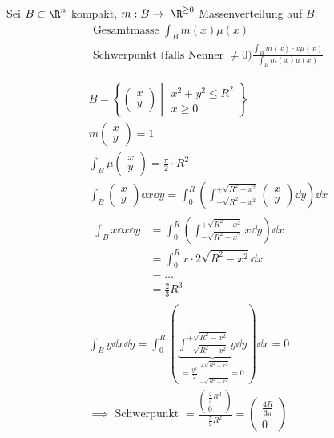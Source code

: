 Sei $B \subset \R^n$ kompakt, $m : B \rightarrow \R^{\geq 0}$ Massenverteilung auf $B$. \\
\begin{gather*}
	\text{Gesamtmasse } \int_B m(x) \mu(x) \\
	\text{Schwerpunkt (falls Nenner $\neq 0$)} \frac{\int_B m(x) \cdot x \mu(x)}{\int_B m(x) \mu(x)}
\end{gather*}
\begin{bsp*}[note = Hablkreisscheibe]
	\begin{gather*}
		B = \left\{ \begin{pmatrix} x \\ y \end{pmatrix} \middle| \begin{matrix} x^2 + y^2 \leq R^2 \\ x \geq 0 \end{matrix} \right\} \\
		m\begin{pmatrix} x \\ y \end{pmatrix} = 1 \\
		\int_B \mu\begin{pmatrix} x \\ y \end{pmatrix} = \frac{\pi}{2} \cdot R^2 \\
		\int_B \begin{pmatrix} x \\ y \end{pmatrix} \dd x \dd y = \int_0^R \left( \int_{-\sqrt{R^2 - x^2}}^{+\sqrt{R^2 - x^2}} \begin{pmatrix} x \\ y \end{pmatrix} \dd y \right) \dd x \\
		\begin{split}
			\int_B x \dd x \dd y
				&= \int_0^R \left( \int_{-\sqrt{R^2 - x^2}}^{+\sqrt{R^2 - x^2}} x \dd y \right) \dd x \\
				&= \int_0^R x \cdot 2 \sqrt{R^2 - x^2} \dd x \\
				&= \dots \\
				&= \frac{2}{3} R^3
		\end{split} \\
		\int_B y \dd x \dd y = \int_0^R \left( \underbrace{\int_{-\sqrt{R^2 - x^2}}^{+\sqrt{R^2 - x^2}} y \dd y}_{= \left. \frac{y^2}{2} \right|_{-\sqrt{R^2 - x^2}}^{+\sqrt{R^2 - x^2}} = 0} \right) \dd x = 0 \\
		\implies \text{ Schwerpunkt } = \frac{\begin{pmatrix} \frac{2}{3} R^3 \\ 0 \end{pmatrix}}{\frac{\pi}{2} R^2} = \begin{pmatrix} \frac{4R}{3\pi} \\ 0 \end{pmatrix}
	\end{gather*}
\end{bsp*}

